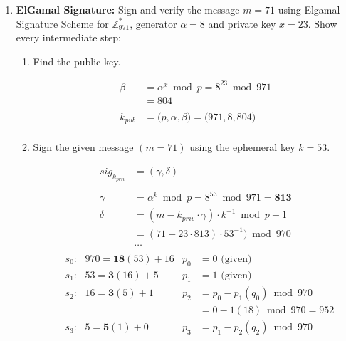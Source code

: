 \documentclass[12pt]{article}
\newenvironment{answer}
{ \begin{tcolorbox}[halign=left]
    }
    {  
  \end{tcolorbox}
}
\begin{document}
\begin{enumerate}
\begin{enumerate}
\begin{answer}
    \end{answer}
  \end{enumerate}

\newpage  

\item \textbf{ElGamal Signature:} Sign and verify the message $m = 71$ using Elgamal Signature
  Scheme for $\mathbb{Z}^*_{971}$, generator $\alpha = 8$ and private key $x = 23$. Show every intermediate step:
  \begin{enumerate}
  \item Find the public key.
    \begin{answer}
      \begin{align*}
        \beta &= \alpha^x \bmod p = 8^{23} \bmod 971 \\
              &= 804 \\
              & \\
        k_{pub} &= \big(p, \alpha, \beta\big) = \big(971, 8, 804\big) \\
      \end{align*}
    \end{answer}
  \item Sign the given message $(m = 71)$ using the ephemeral key $k = 53$.
    \begin{answer}
      \begin{align*}
        sig_{k_{priv}} &= (\gamma, \delta) \\
                     &\\
        \gamma &= \alpha^k \bmod p = 8^{53} \bmod 971 = \bm{813} \\
        \delta &= (m - k_{priv} \cdot \gamma) \cdot k^{-1} \bmod p - 1 \\
                     &= (71 - 23\cdot 813) \cdot 53^{-1}) \bmod 970 \\
                       &\ldots \\
      \end{align*}
      \begin{align*}
        &s_0: \text{  }970 = \bm{18}(53) + 16 &p_0 &= 0 \text{ (given)}\\
        &s_1: \text{  }53 = \bm{3}(16) + 5 &p_1 &= 1 \text{ (given)}\\
        &s_2: \text{  }16 = \bm{3}(5) + 1 &p_2 &= p_0 - p_1(q_0) \bmod 970 \\ 
        & & &= 0 - 1(18) \bmod 970 = 952 \\
        &s_3: \text{  }5 = \bm{5}(1) + 0 &p_3 &= p_1 - p_2(q_2) \bmod 970 \\ 

\end{align*}
\end{answer}
\end{enumerate}
\end{enumerate}
\end{document}
